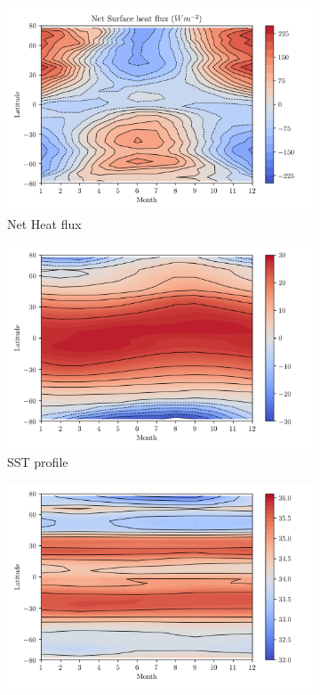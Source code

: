 \documentclass[a4paper]{article}
\begin{document}
\begin{figure}[H]
\begin{subfigure}{.5\textwidth}
	\includegraphics[width=\linewidth]{q_net_profile.png}
	\caption{Net Heat flux}
	\label{fig:qnet}
\end{subfigure}
\begin{subfigure}{.5\textwidth}
	\includegraphics[width=\linewidth]{sst_profile.png}
	\caption{SST profile}
	\label{fig:sst_profile}
\end{subfigure}
\begin{subfigure}{.5\textwidth}
	\includegraphics[width=\linewidth]{sss_profile.png}

\end{subfigure}
\end{figure}
\end{document}
